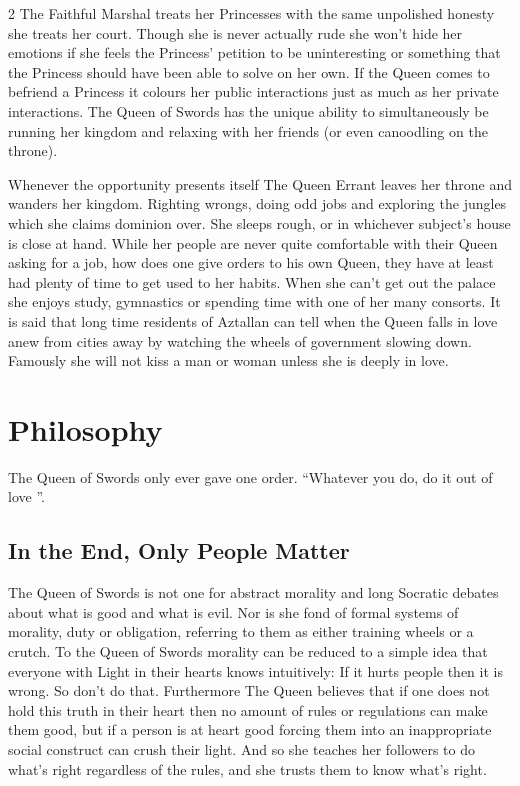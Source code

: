 \begin{multicols}{2}
The Faithful Marshal treats her Princesses with the same unpolished honesty she treats her court. Though she is never actually rude she won't hide her emotions if she feels the Princess' petition to be uninteresting or something that the Princess should have been able to solve on her own. If the Queen comes to befriend a Princess it colours her public interactions just as much as her private interactions. The Queen of Swords has the unique ability to simultaneously be running her kingdom and relaxing with her friends (or even canoodling on the throne).

Whenever the opportunity presents itself The Queen Errant leaves her throne and wanders her kingdom. Righting wrongs, doing odd jobs and exploring the jungles which she claims dominion over. She sleeps rough, or in whichever subject's house is close at hand. While her people are never quite comfortable with their Queen asking for a job, how does one give orders to his own Queen, they have at least had plenty of time to get used to her habits. When she can't get out the palace she enjoys study, gymnastics or spending time with one of her many consorts. It is said that long time residents of Aztallan can tell when the Queen falls in love anew from cities away by watching the wheels of government slowing down. Famously she will not kiss a man or woman unless she is deeply in love. 

\section*{Philosophy}

The Queen of Swords only ever gave one order. \textquotedblleft Whatever you do, do it out of love \textquotedblright. 

\subsection*{In the End, Only People Matter}

The Queen of Swords is not one for abstract morality and long Socratic debates about what is good and what is evil. Nor is she fond of formal systems of morality, duty or obligation, referring to them as either training wheels or a crutch. To the Queen of Swords morality can be reduced to a simple idea that everyone with Light in their hearts knows intuitively: If it hurts people then it is wrong. So don't do that. Furthermore The Queen believes that if one does not hold this truth in their heart then no amount of rules or regulations can make them good, but if a person is at heart good forcing them into an inappropriate social construct can crush their light. And so she teaches her followers to do what's right regardless of the rules, and she trusts them to know what's right. 


\end{multicols}
